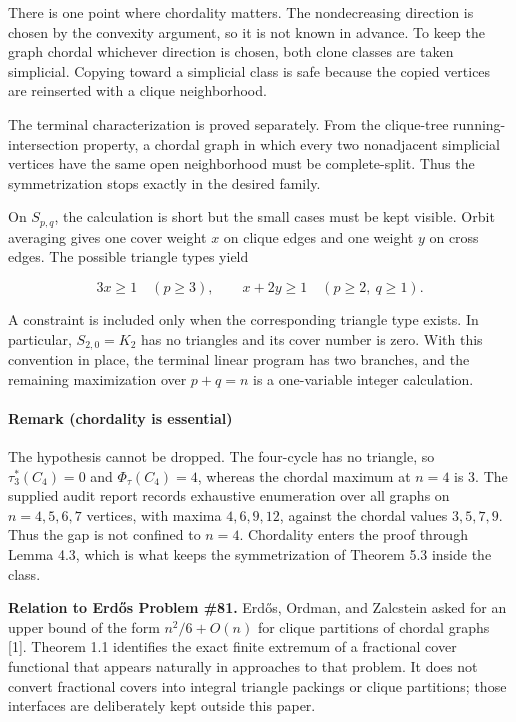 \documentclass[english,11pt,a4paper]{article}
\begin{document}
There is one point where chordality matters. The nondecreasing direction
is chosen by the convexity argument, so it is not known in advance. To
keep the graph chordal whichever direction is chosen, both clone classes
are taken simplicial. Copying toward a simplicial class is safe because
the copied vertices are reinserted with a clique neighborhood.

The terminal characterization is proved separately. From the clique-tree
running-intersection property, a chordal graph in which every two
nonadjacent simplicial vertices have the same open neighborhood must be
complete-split. Thus the symmetrization stops exactly in the desired
family.

On \(S_{p,q}\), the calculation is short but the small cases must be
kept visible. Orbit averaging gives one cover weight \(x\) on clique
edges and one weight \(y\) on cross edges. The possible triangle types
yield

\[
3x\ge1
\quad(p\ge3),
\qquad
x+2y\ge1
\quad(p\ge2,\ q\ge1).
\]

A constraint is included only when the corresponding triangle type
exists. In particular, \(S_{2,0}=K_2\) has no triangles and its cover
number is zero. With this convention in place, the terminal linear
program has two branches, and the remaining maximization over \(p+q=n\)
is a one-variable integer calculation.

\paragraph{Remark (chordality is
essential)}\label{remark-chordality-is-essential}

The hypothesis cannot be dropped. The four-cycle has no triangle, so
\(\tau_3^*(C_4)=0\) and \(\Phi_\tau(C_4)=4\), whereas the chordal
maximum at \(n=4\) is \(3\). The supplied audit report records
exhaustive enumeration over all graphs on \(n=4,5,6,7\) vertices, with
maxima \(4,6,9,12\), against the chordal values \(3,5,7,9\). Thus the
gap is not confined to \(n=4\). Chordality enters the proof through
Lemma 4.3, which is what keeps the symmetrization of Theorem 5.3 inside
the class.

\textbf{Relation to Erdős Problem \#81.} Erdős, Ordman, and Zalcstein
asked for an upper bound of the form \(n^2/6+O(n)\) for clique
partitions of chordal graphs {[}1{]}. Theorem 1.1 identifies the exact
finite extremum of a fractional cover functional that appears naturally
in approaches to that problem. It does not convert fractional covers
into integral triangle packings or clique partitions; those interfaces
are deliberately kept outside this paper.
\end{document}
